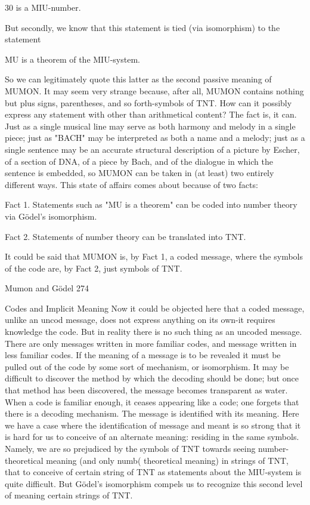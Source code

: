                                   30 is a MIU-number.

But secondly, we know that this statement is tied (via isomorphism) to the statement

                          MU is a theorem of the MIU-system.

So we can legitimately quote this latter as the second passive meaning of MUMON. It
may seem very strange because, after all, MUMON contains nothing but plus signs,
parentheses, and so forth-symbols of TNT. How can it possibly express any statement
with other than arithmetical content?
        The fact is, it can. Just as a single musical line may serve as both harmony and
melody in a single piece; just as "BACH" may be interpreted as both a name and a
melody; just as a single sentence may be an accurate structural description of a picture by
Escher, of a section of DNA, of a piece by Bach, and of the dialogue in which the
sentence is embedded, so MUMON can be taken in (at least) two entirely different ways.
This state of affairs comes about because of two facts:

   Fact 1. Statements such as "MU is a theorem" can be coded into number theory
        via Gödel’s isomorphism.

   Fact 2. Statements of number theory can be translated into TNT.

It could be said that MUMON is, by Fact 1, a coded message, where the symbols of the
code are, by Fact 2, just symbols of TNT.




Mumon and Gödel                                                                        274

                           Codes and Implicit Meaning
Now it could be objected here that a coded message, unlike an uncod message, does not
express anything on its own-it requires knowledge the code. But in reality there is no
such thing as an uncoded message. There are only messages written in more familiar
codes, and message written in less familiar codes. If the meaning of a message is to be
revealed it must be pulled out of the code by some sort of mechanism, or isomorphism. It
may be difficult to discover the method by which the decoding should be done; but once
that method has been discovered, the message becomes transparent as water. When a
code is familiar enough, it ceases appearing like a code; one forgets that there is a
decoding mechanism. The message is identified with its meaning.
         Here we have a case where the identification of message and meant is so strong
that it is hard for us to conceive of an alternate meaning: residing in the same symbols.
Namely, we are so prejudiced by the symbols of TNT towards seeing number-theoretical
meaning (and only numb( theoretical meaning) in strings of TNT, that to conceive of
certain string of TNT as statements about the MIU-system is quite difficult. But Gödel’s
isomorphism compels us to recognize this second level of meaning certain strings of
TNT.

